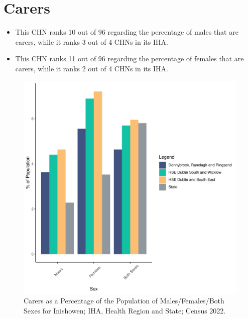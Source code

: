 \documentclass{article}
\begin{document}
\section{Carers}\label{sect:Carers}
\begin{itemize}
\item This CHN ranks  10 out of 96 regarding the percentage of males that are carers, while it ranks   3 out of 4 CHNs in its IHA.
\item This CHN ranks  11 out of 96 regarding the percentage of females that are carers, while it ranks   2 out of 4 CHNs in its IHA.
\end{itemize}
\begin{figure}[H]
	\centering
	\includegraphics[width = 150mm]{../figures/CareED.pdf}
	\caption{Carers as a Percentage of the Population of Males/Females/Both Sexes for Inishowen; IHA, Health Region and State; Census 2022.}
	\label{fig:2ae19629-1a6a-13a3-e055-000000000001}
	\end{figure}
\end{document}
